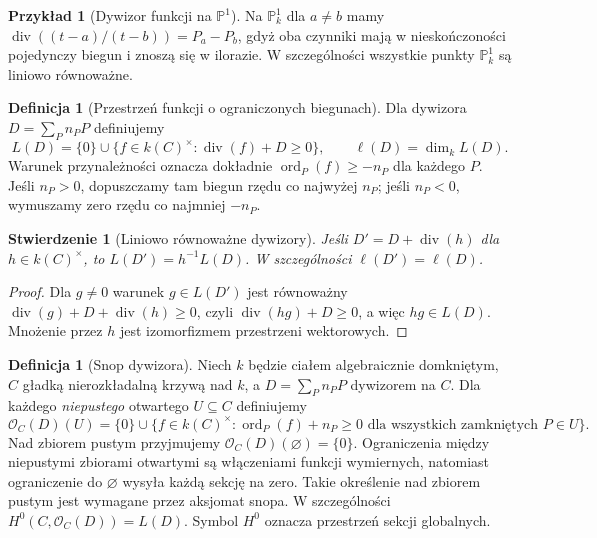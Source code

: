 \documentclass[11pt,a4paper,openany]{report}
\numberwithin{equation}{section}
\theoremstyle{plain}
\newtheorem{stwierdzenie}[twierdzenie]{Stwierdzenie}
\theoremstyle{definition}
\newtheorem{definicja}[twierdzenie]{Definicja}
\newtheorem{przyklad}[twierdzenie]{Przykład}
\theoremstyle{remark}
\newcommand{\PP}{\mathbb P}
\begin{document}
\begin{przyklad}[Dywizor funkcji na $\PP^1$]
Na $\PP^1_k$ dla $a\ne b$ mamy
$\operatorname{div}((t-a)/(t-b))=P_a-P_b$,
gdyż oba czynniki mają w nieskończoności
pojedynczy biegun i znoszą się w ilorazie.
W szczególności wszystkie punkty $\PP^1_k$
są liniowo równoważne.
\end{przyklad}

\begin{definicja}[Przestrzeń funkcji o ograniczonych biegunach]
Dla dywizora $D=\sum_Pn_PP$ definiujemy
\[
 L(D)=\{0\}\cup\{f\in k(C)^\times:
 \operatorname{div}(f)+D\ge0\},\qquad
 \ell(D)=\dim_k L(D).
\]
Warunek przynależności oznacza dokładnie
$\operatorname{ord}_P(f)\ge-n_P$ dla każdego $P$.
Jeśli $n_P>0$, dopuszczamy tam biegun rzędu
co najwyżej $n_P$; jeśli $n_P<0$, wymuszamy
zero rzędu co najmniej $-n_P$.
\end{definicja}

\begin{stwierdzenie}[Liniowo równoważne dywizory]
Jeśli $D'=D+\operatorname{div}(h)$ dla
$h\in k(C)^\times$, to
$L(D')=h^{-1}L(D)$. W szczególności
$\ell(D')=\ell(D)$.
\end{stwierdzenie}
\begin{proof}
Dla $g\ne0$ warunek $g\in L(D')$ jest równoważny
$\operatorname{div}(g)+D+\operatorname{div}(h)\ge0$,
czyli $\operatorname{div}(hg)+D\ge0$, a więc
$hg\in L(D)$. Mnożenie przez $h$ jest
izomorfizmem przestrzeni wektorowych.
\end{proof}

\begin{definicja}[Snop dywizora]
\label{def:O-D}
Niech $k$ będzie ciałem algebraicznie domkniętym,
$C$ gładką nierozkładalną krzywą nad $k$,
a $D=\sum_Pn_PP$ dywizorem na $C$.
Dla każdego \emph{niepustego} otwartego $U\subseteq C$
definiujemy
\[
 \mathcal O_C(D)(U)=\{0\}\cup\{f\in k(C)^\times:
 \operatorname{ord}_P(f)+n_P\ge0
 \text{ dla wszystkich zamkniętych }P\in U\}.
\]
Nad zbiorem pustym przyjmujemy
$\mathcal O_C(D)(\varnothing)=\{0\}$.
Ograniczenia między niepustymi zbiorami otwartymi
są włączeniami funkcji wymiernych, natomiast
ograniczenie do $\varnothing$ wysyła każdą sekcję
na zero. Takie określenie nad zbiorem pustym
jest wymagane przez aksjomat snopa.
W szczególności $H^0(C,\mathcal O_C(D))=L(D)$.
Symbol $H^0$ oznacza przestrzeń sekcji globalnych.
\end{definicja}
\end{document}
